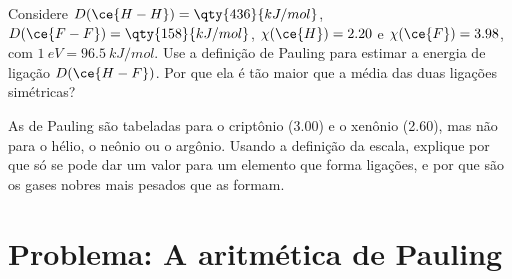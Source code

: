 \begin{exercise}[$\star\star\star$]\label{exo:b1:periodicity:11}
Considere $D(\ce{H-H}) = \qty{436}{kJ/mol}$, $D(\ce{F-F}) =
\qty{158}{kJ/mol}$, $\chi(\ce{H}) = 2.20$ e $\chi(\ce{F}) = 3.98$, com
$\qty{1}{eV} = \qty{96.5}{kJ/mol}$. Use a definição de Pauling para estimar
a energia de ligação $D(\ce{H-F})$. Por que ela é tão maior que a média
das duas ligações simétricas?
\end{exercise}

\begin{exercise}[$\star\star\star$]\label{exo:b1:periodicity:12}
As  de Pauling são tabeladas para o criptônio (3.00) e
o xenônio (2.60), mas não para o hélio, o neônio ou o argônio. Usando a
definição da escala, explique por que só se pode dar um valor para um
elemento que forma ligações, e por que são os gases nobres mais pesados
que as formam.
\end{exercise}

\section{Problema: A aritmética de Pauling}

